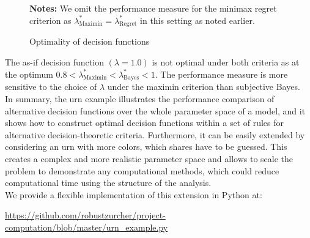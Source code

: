 \begin{figure}[h!]\centering
{}\vspace{-0.9cm}
\begin{center}
\begin{minipage}[t]{0.5\columnwidth}
\item \scriptsize{\textbf{Notes:} We omit the performance measure for the minimax regret criterion as $\lambda^*_{\text{Maximin}} = \lambda^*_{\text{Regret}}$ in this setting as noted earlier.}
\end{minipage}
\end{center}
\caption{Optimality of decision functions}\label{Optimality of decision functions for urn}
\end{figure}\FloatBarrier

The as-if decision function $(\lambda=1.0)$ is not optimal under both criteria as at the optimum  $0.8 < \lambda^*_{\text{Maximin}} < \lambda^*_{\text{Bayes}} < 1$. The performance measure is more sensitive to the choice of $\lambda$ under the maximin criterion than subjective Bayes.\\

In summary, the urn example illustrates the performance comparison of alternative decision functions over the whole parameter space of a model, and it shows how to construct optimal decision functions within a set of rules for alternative decision-theoretic criteria. Furthermore, it can be easily extended by considering an urn with more colors, which shares have to be guessed. This creates a complex and more realistic parameter space and allows to scale the problem to demonstrate any computational methods, which could reduce computational time using the structure of the analysis.\\

We provide a flexible implementation of this extension in Python at:

\begin{center}
\href{https://github.com/robustzurcher/project-computation/blob/master/implementation.py}{https://github.com/robustzurcher/project-computation/blob/master/urn\_example.py}
\end{center}
